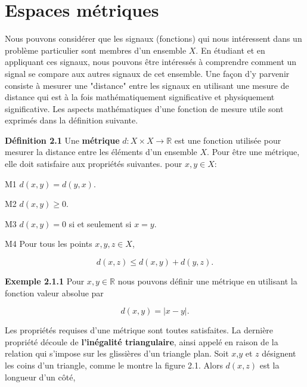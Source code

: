 \documentclass[10pt,twoside,a4paper]{book}
\begin{document}

\section{Espaces métriques}

\noindent
Nous pouvons considérer que les signaux (fonctions) qui nous intéressent dans un problème particulier sont membres d'un ensemble $X$. En étudiant et en appliquant ces signaux, nous pouvons être intéressés à comprendre 
comment un signal se compare aux autres signaux de cet ensemble. Une façon d'y parvenir consiste à mesurer une "distance" entre les signaux en utilisant une mesure de distance qui est à la fois mathématiquement significative 
et physiquement significative. Les aspects mathématiques d'une fonction de mesure utile sont exprimés dans la définition suivante.
\vspace{4mm}

\noindent
\textbf{Définition 2.1} Une \textbf{métrique} $d: X \times X \longrightarrow \mathbb{R}$ est une fonction utilisée pour mesurer la distance entre les éléments d'un ensemble $X$. 
Pour être une métrique, elle doit satisfaire aux propriétés suivantes. pour $x, y \in \textit{X}$:
\vspace{2mm}

M1 $d(x, y) = d(y, x)$.

M2 $d(x, y) \geq 0$.

M3 $d(x, y) = 0$ si et seulement si $x = y$.

M4 Pour tous les points $x, y, z \in \textit{X}$,

\begin{equation}
       d(x, z) \leq d(x, y) + d(y, z).
\end{equation}

\vspace{4mm}

\noindent
\textbf{Exemple 2.1.1} Pour $x, y \in \mathbb{R}$ nous pouvons définir une métrique en utilisant la fonction valeur absolue par

\begin{equation*}
       d(x, y) = |x - y|.
\end{equation*}

\noindent
Les propriétés requises d'une métrique sont toutes satisfaites. La dernière propriété découle de \textbf{l'inégalité triangulaire}, 
ainsi appelé en raison de la relation qui s'impose sur les glissières d'un triangle plan. Soit $x$,$y$ et $z$ désignent les coins d'un triangle, 
comme le montre la figure 2.1. Alors $d(x, z)$ est la longueur d'un côté,
\end{document}
